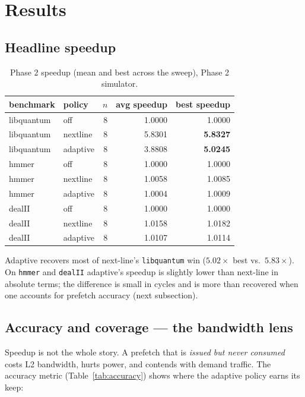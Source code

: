 \documentclass[11pt,letterpaper]{article}
\begin{document}
\section{Results}
\label{sec:results}

\subsection{Headline speedup}

\begin{table}[H]
\centering
\caption{Phase 2 speedup (mean and best across the sweep), Phase 2 simulator.}
\label{tab:speedup}
\begin{tabular}{llrrr}
\toprule
benchmark    & policy   & $n$ & avg speedup & best speedup \\
\midrule
libquantum   & off      & 8 & 1.0000 & 1.0000 \\
libquantum   & nextline & 8 & 5.8301 & \textbf{5.8327} \\
libquantum   & adaptive & 8 & 3.8808 & \textbf{5.0245} \\
\midrule
hmmer        & off      & 8 & 1.0000 & 1.0000 \\
hmmer        & nextline & 8 & 1.0058 & 1.0085 \\
hmmer        & adaptive & 8 & 1.0004 & 1.0009 \\
\midrule
dealII       & off      & 8 & 1.0000 & 1.0000 \\
dealII       & nextline & 8 & 1.0158 & 1.0182 \\
dealII       & adaptive & 8 & 1.0107 & 1.0114 \\
\bottomrule
\end{tabular}
\end{table}

Adaptive recovers most of next-line's \texttt{libquantum} win
($5.02\times$ best vs.\ $5.83\times$). On \texttt{hmmer} and \texttt{dealII}
adaptive's speedup is slightly lower than next-line in absolute terms; the
difference is small in cycles and is more than recovered when one accounts
for prefetch accuracy (next subsection).

\subsection{Accuracy and coverage --- the bandwidth lens}
Speedup is not the whole story. A prefetch that is \emph{issued but never
consumed} costs L2 bandwidth, hurts power, and contends with demand
traffic. The accuracy metric (Table~\ref{tab:accuracy}) shows where the
adaptive policy earns its keep:
\end{document}
